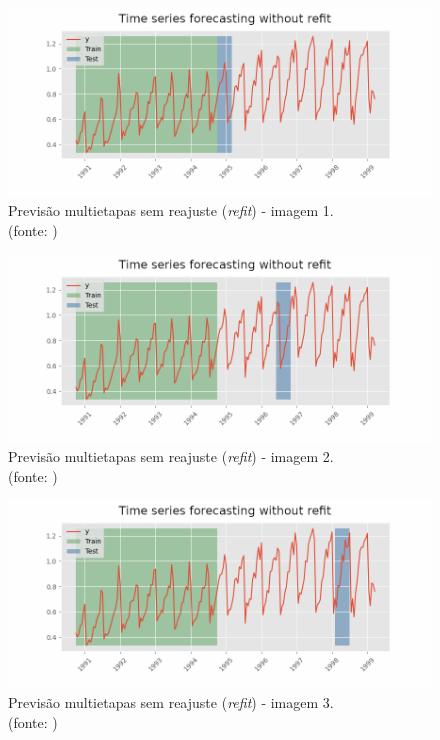 \begin{figure}[!h]
	\centering
	\includegraphics[scale=0.3]{Figuras/imagem1_skforecast-backtesting-no-refit.png}
	\caption{Previsão multietapas sem reajuste (\textit{refit}) - imagem 1.\\(fonte: \cite{skforecast})}
	\label{fig:imagem1_skforecast-backtesting-no-refit}
\end{figure}

\begin{figure}[!h]
	\centering
	\includegraphics[scale=0.3]{Figuras/imagem2_skforecast-backtesting-no-refit.png}
	\caption{Previsão multietapas sem reajuste (\textit{refit}) - imagem 2.\\(fonte: \cite{skforecast})}
	\label{fig:imagem2_skforecast-backtesting-no-refit}
\end{figure}

\begin{figure}[!h]
	\centering
	\includegraphics[scale=0.3]{Figuras/imagem3_skforecast-backtesting-no-refit.png}
	\caption{Previsão multietapas sem reajuste (\textit{refit}) - imagem 3.\\(fonte: \cite{skforecast})}
	\label{fig:imagem3_skforecast-backtesting-no-refit}
\end{figure}

